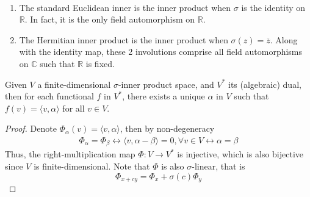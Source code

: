 \documentclass{treatise}
\begin{document}
\begin{shaded}
\begin{proposition}
\begin{enumerate}
\end{enumerate}
\end{proposition}
\begin{example} \ 
\begin{enumerate}
	\item The standard Euclidean inner is the inner product when $\sigma$ is the identity on $\mathbb{R}$. In fact, it is the only field automorphism on $\mathbb{R}$.
	\item The Hermitian inner product is the inner product when $\sigma(z) = \overline{z}$. Along with the identity map, these 2 involutions comprise all field automorphisms on $\mathbb{C}$ such that $\mathbb{R}$ is fixed.
\end{enumerate}
\end{example}
\begin{theorem}
Given $V$ a finite-dimensional $\sigma$-inner product space, and $V^*$ its (algebraic) dual, then for each functional $f$ in $V^*$, there exists a unique $\alpha$ in $V$ such that $f(v) = \langle v, \alpha \rangle$ for all $v \in V$.
\end{theorem}
\begin{proof}
Denote $\Phi_\alpha (v) = \langle v, \alpha \rangle$, then by non-degeneracy
\begin{align*}
\Phi_\alpha = \Phi_\beta \leftrightarrow \langle v, \alpha - \beta \rangle = 0, \forall v \in V \leftrightarrow \alpha = \beta
\end{align*}
Thus, the right-multiplication map $\Phi: V \to V^*$ is injective, which is also bijective since $V$ is finite-dimensional. Note that $\Phi$ is also $\sigma$-linear, that is
$$\Phi_{x + cy} = \Phi_x + \sigma(c) \Phi_y$$
\end{proof}


\end{shaded}
\end{document}
